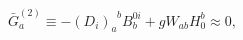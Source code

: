 \begin{equation}
\bar{G}_{a}^{(2)}\equiv -\left( D_{i}\right)
_{a}^{\;\;b}B_{b}^{0i}+gW_{ab}H_{0}^{b}\approx 0,  \label{i3}
\end{equation}

